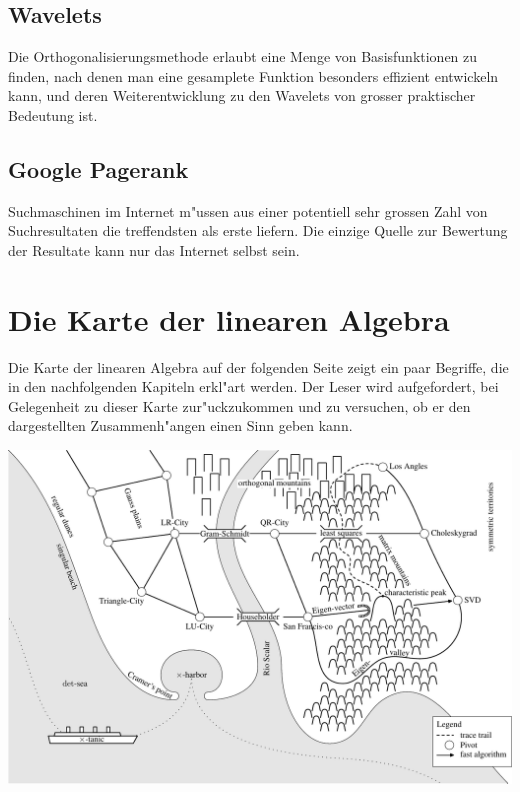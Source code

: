 \subsection*{Wavelets}
Die Orthogonalisierungsmethode erlaubt eine Menge von
Basisfunktionen zu finden, nach denen man eine gesamplete Funktion
besonders effizient entwickeln kann, und deren Weiterentwicklung
zu den Wavelets von grosser praktischer Bedeutung ist.

\subsection*{Google Pagerank}
Suchmaschinen im Internet m"ussen aus einer potentiell sehr grossen Zahl
von Suchresultaten die treffendsten als erste liefern.
Die einzige Quelle zur Bewertung der Resultate kann nur
das Internet selbst sein.

\section*{Die Karte der linearen Algebra}
Die Karte der linearen Algebra auf der folgenden Seite zeigt ein
paar Begriffe, die in den nachfolgenden Kapiteln erkl"art werden.
Der Leser wird aufgefordert, bei Gelegenheit zu dieser Karte
zur"uckzukommen und zu versuchen, ob er den dargestellten
Zusammenh"angen einen Sinn geben kann.

\begin{landscape}
\begin{center}
\includegraphics[width=0.95\hsize]{images/linalgmap-1}
\end{center}
\end{landscape}
